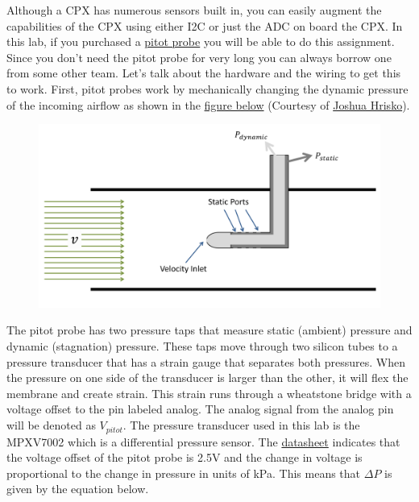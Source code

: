 Although a CPX has numerous sensors built in, you can easily augment the capabilities of the CPX using either I2C or just the ADC on board the CPX. In this lab, if you purchased a \href{https://www.amazon.com/Hobbypower-Airspeed-MPXV7002DP-Differential-controller/dp/B00WSFWO36/ref=sr_1_3?dchild=1&keywords=Airspeed+sensor+kit&qid=1590532161&sr=8-3}{pitot probe} you will be able to do this assignment. Since you don’t need the pitot probe for very long you can always borrow one from some other team. Let’s talk about the hardware and the wiring to get this to work. First, pitot probes work by mechanically changing the dynamic pressure of the incoming airflow as shown in the \href{https://makersportal.com/blog/2019/02/06/arduino-pitot-tube-wind-speed-theory-and-experiment}{figure below} (Courtesy of \href{https://makersportal.com/blog?author=59b036fc6073554c1cfffef7}{Joshua Hrisko}).
\begin{figure}[H]
  \begin{center}
    \includegraphics[width=\textwidth]{Figures/pitot_tube_drawing_transparent_cleaner.png}
  \end{center}
\end{figure}
The pitot probe has two pressure taps that measure static (ambient) pressure and dynamic (stagnation) pressure. These taps move through two silicon tubes to a pressure transducer that has a strain gauge that separates both pressures. When the pressure on one side of the transducer is larger than the other, it will flex the membrane and create strain. This strain runs through a wheatstone bridge with a voltage offset to the pin labeled analog. The analog signal from the analog pin will be denoted as $V_{pitot}$. The pressure transducer used in this lab is the MPXV7002 which is a differential pressure sensor. The \href{https://www.nxp.com/docs/en/data-sheet/MPXV7002.pdf}{datasheet} indicates that the voltage offset of the pitot probe is 2.5V and the change in voltage is proportional to the change in pressure in units of kPa. This means that $\Delta P$ is given by the equation below.
